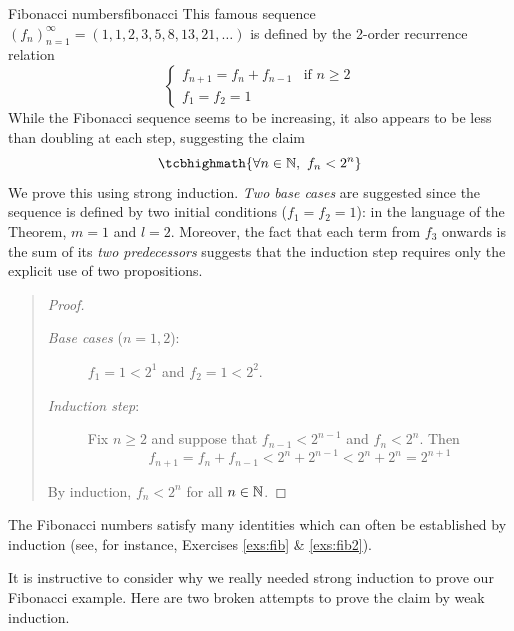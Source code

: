 \begin{example}{Fibonacci numbers}{fibonacci}
	This famous sequence $(f_n)_{n=1}^\infty=(1,1,2,3,5,8,13,21,\ldots)$ is defined by the 2\nd-order recurrence relation
	\[
		\begin{cases}
			f_{n+1}=f_n+f_{n-1}&\text{if }n\ge 2\\
			f_1=f_2=1&
		\end{cases}
	\]
	While the Fibonacci sequence seems to be increasing, it also appears to be less than doubling at each step, suggesting the claim
	\[
		\tcbhighmath{\forall n\in\N,\ f_n<2^n}
	\]
	We prove this using strong induction. \emph{Two base cases} are suggested since the sequence is defined by two initial conditions ($f_1=f_2=1$): in the language of the Theorem, $m=1$ and $l=2$. Moreover, the fact that each term from $f_3$ onwards is the sum of its \emph{two predecessors} suggests that the induction step requires only the explicit use of two propositions.
	\begin{quote}
		\begin{proof}
			\begin{description}
				\item[\normalfont\emph{Base cases} ($n=1,2$):] $f_1=1<2^1$ and $f_2=1<2^2$.
				\item[\normalfont\emph{Induction step}:] Fix $n\ge 2$ and suppose\footnotemark{} that $f_{n-1}<2^{n-1}$ and $f_n<2^n$. Then
				\[
					f_{n+1}=f_n+f_{n-1}<2^n+2^{n-1}<2^n+2^n=2^{n+1}
				\]
			\end{description} 
			By induction, $f_n<2^n$ for all $n\in\mathbb{N}$.
		\end{proof}
	\end{quote}
	The Fibonacci numbers satisfy many identities which can often be established by induction (see, for instance, Exercises \ref{exs:fib} \& \ref{exs:fib2}).
\end{example}

\vspace{-5pt}


\goodbreak

It is instructive to consider why we really needed strong induction to prove our Fibonacci example. Here are two broken attempts to prove the claim by weak induction.

